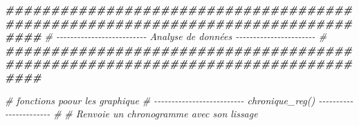\documentclass[
]{article}
\newenvironment{Shaded}{\begin{snugshade}}{\end{snugshade}}
\newcommand{\CommentTok}[1]{\textcolor[rgb]{0.56,0.35,0.01}{\textit{#1}}}
\newcommand{\DocumentationTok}[1]{\textcolor[rgb]{0.56,0.35,0.01}{\textbf{\textit{#1}}}}
\begin{document}
\begin{Shaded}
\begin{Highlighting}[]
\DocumentationTok{\#\#\#\#\#\#\#\#\#\#\#\#\#\#\#\#\#\#\#\#\#\#\#\#\#\#\#\#\#\#\#\#\#\#\#\#\#\#\#\#\#\#\#\#\#\#\#\#\#\#\#\#\#\#\#\#\#\#\#\#\#\#\#\#\#\#\#\#\#\#\#\#\#\#\#\#\#\#\#\#}
\CommentTok{\# {-}{-}{-}{-}{-}{-}{-}{-}{-}{-}{-}{-}{-}{-}{-}{-}{-}{-}{-}{-}{-}{-}{-}{-}{-}{-}  Analyse de données       {-}{-}{-}{-}{-}{-}{-}{-}{-}{-}{-}{-}{-}{-}{-}{-}{-}{-}{-}{-}{-}{-}{-} \#}
\DocumentationTok{\#\#\#\#\#\#\#\#\#\#\#\#\#\#\#\#\#\#\#\#\#\#\#\#\#\#\#\#\#\#\#\#\#\#\#\#\#\#\#\#\#\#\#\#\#\#\#\#\#\#\#\#\#\#\#\#\#\#\#\#\#\#\#\#\#\#\#\#\#\#\#\#\#\#\#\#\#\#\#\#}


\CommentTok{\# fonctions poour les graphique }
\CommentTok{\# {-}{-}{-}{-}{-}{-}{-}{-}{-}{-}{-}{-}{-}{-}{-}{-}{-}{-}{-}{-}{-}{-}{-}{-}{-}{-}  chronique\_reg()          {-}{-}{-}{-}{-}{-}{-}{-}{-}{-}{-}{-}{-}{-}{-}{-}{-}{-}{-}{-}{-}{-}{-} \#}
\CommentTok{\# Renvoie un chronogramme avec son lissage}


\end{Highlighting}
\end{Shaded}
\end{document}
